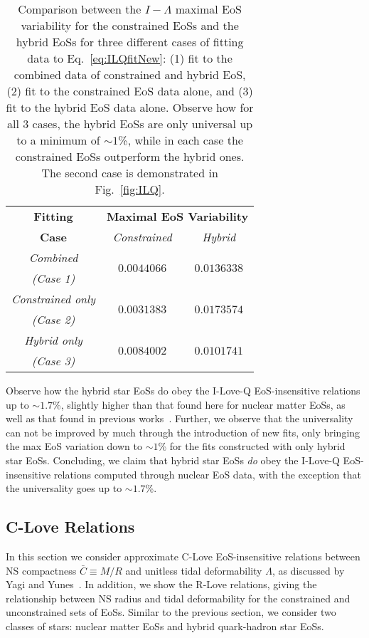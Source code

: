 \documentclass[prd,twocolumn,nofootinbib,superscriptaddress,amsmath,amssymb]{revtex4-1}
\begin{document}
\begin{table}
\centering
\caption{
Comparison between the $I-\Lambda$ maximal EoS variability for the constrained EoSs and the hybrid EoSs for three different cases of fitting data to Eq.~\ref{eq:ILQfitNew}: (1) fit to the combined data of constrained and hybrid EoS, (2) fit to the constrained EoS data alone, and (3) fit to the hybrid EoS data alone.
Observe how for all 3 cases, the hybrid EoSs are only universal up to a minimum of $\sim1$\%, while in each case the constrained EoSs outperform the hybrid ones.
The second case is demonstrated in Fig.~\ref{fig:ILQ}.
}\label{tab:hybridCompare}
\begin{tabular}{ c  || c c } 
 \hline
 \hline
 \textbf{Fitting} & \multicolumn{2}{c}{\textbf{Maximal EoS Variability}} \\
 \cline{2-3}
 \textbf{Case} &  \multicolumn{1}{c|}{\emph{Constrained}} & \emph{Hybrid}\\
 \hline
 \emph{Combined} &  \multirow{2}{*}{$0.0044066$} & \multirow{2}{*}{$0.0136338$}\\
 \emph{(Case 1)} & &\\
 \cline{1-1}
 \emph{Constrained only} & \multirow{2}{*}{$0.0031383$} & \multirow{2}{*}{$0.0173574$}\\
  \emph{(Case 2)} & &\\
  \cline{1-1}
 \emph{Hybrid only} & \multirow{2}{*}{$0.0084002$} & \multirow{2}{*}{$0.0101741$}\\
  \emph{(Case 3)} & &\\
  \cline{1-1}
\hline
\hline
\end{tabular}
\end{table}

Observe how the hybrid star EoSs do obey the I-Love-Q EoS-insensitive relations up to $\sim1.7$\%, slightly higher than that found here for nuclear matter EoSs, as well as that found in previous works~\cite{Yagi:ILQ}.
Further, we observe that the universality can not be improved by much through the introduction of new fits, only bringing the max EoS variation down to $\sim1$\% for the fits constructed with only hybrid star EoSs.
Concluding, we claim that hybrid star EoSs \emph{do} obey the I-Love-Q EoS-insensitive relations computed through nuclear EoS data, with the exception that the universality goes up to $\sim1.7$\%. 


\subsection{C-Love Relations}\label{sec:clove}
In this section we consider approximate C-Love EoS-insensitive relations between NS compactness $\bar{C} \equiv M/R$ and unitless tidal deformability $\Lambda$, as discussed by Yagi and Yunes~\cite{Yagi:binLove}.
In addition, we show the R-Love relations, giving the relationship between NS radius and tidal deformability for the constrained and unconstrained sets of EoSs.
Similar to the previous section, we consider two classes of stars: nuclear matter EoSs and hybrid quark-hadron star EoSs.
\end{document}
